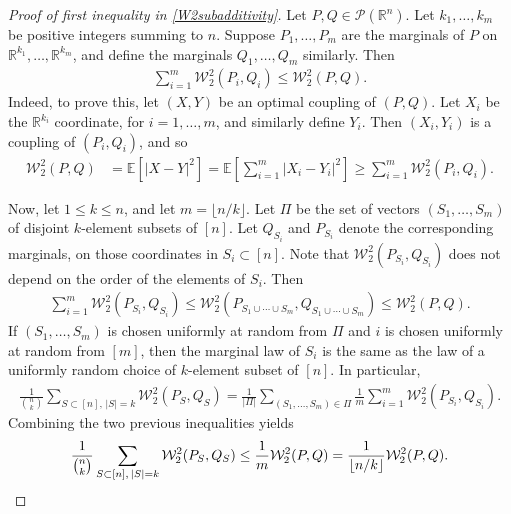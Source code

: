 \documentclass[11pt,reqno]{amsart}
\numberwithin{equation}{section}
\theoremstyle{definition}
\def\E{{\mathbb E}}
\def\R{{\mathbb R}}
\def\P{{\mathcal P}}
\begin{document}
\begin{proof}[Proof of first inequality in \eqref{W2subadditivity}]
	Let $P,Q \in \P(\R^n)$. Let $k_1,\ldots,k_m$ be positive integers summing to $n$. Suppose $P_1,\ldots,P_m$ are the marginals of $P$ on $\R^{k_1},\ldots,\R^{k_m}$, and define the marginals $Q_1,\ldots,Q_m$ similarly. Then
	\begin{align*}
		\sum_{i=1}^m \mathcal{W}_2^2(P_i,Q_i) \le \mathcal{W}_2^2(P,Q).
	\end{align*}
	Indeed, to prove this, let $(X,Y)$ be an optimal coupling of $(P,Q)$. Let $X_i$ be the $\R^{k_i}$ coordinate, for $i=1,\ldots,m$, and similarly define $Y_i$. Then $(X_i,Y_i)$ is a coupling of $(P_i,Q_i)$, and so
	\begin{align*}
		\mathcal{W}_2^2(P,Q) &= \E\left[|X-Y|^2\right] = \E\left[\sum_{i=1}^m  |X_i-Y_i|^2 \right]\ge \sum_{i=1}^m \mathcal{W}_2^2(P_i,Q_i).
	\end{align*}
	
	Now, let $1 \le k \le n$, and let $m=\lfloor n/k\rfloor$. Let $\Pi$ be the set of vectors $(S_1,\ldots,S_m)$ of disjoint $k$-element subsets of $[n]$. Let $Q_{S_i}$ and $P_{S_i}$ denote the corresponding marginals, on those coordinates in $S_i \subset [n]$. Note that $\mathcal{W}_2^2(P_{S_i},Q_{S_i})$ does not depend on the order of the elements of $S_i$. Then
	\begin{align*}
		\sum_{i=1}^m \mathcal{W}_2^2(P_{S_i},Q_{S_i}) \le \mathcal{W}_2^2(P_{S_1 \cup \cdots \cup S_m},Q_{S_1 \cup \cdots \cup S_m}) \le \mathcal{W}_2^2(P,Q).
	\end{align*}
	If $(S_1,\ldots,S_m)$ is chosen uniformly at random from $\Pi$ and $ i $ is chosen uniformly at random from $[m]$, then the marginal law of $S_i$ is the same as the law of a uniformly random choice of $k$-element subset of $[n]$.
	In particular,
	\begin{align*}
		\frac{1}{\binom{n}{k}}\sum_{S \subset [n], \, |S|=k} \mathcal{W}_2^2(P_{S},Q_{S}) = \frac{1}{|\Pi|}\sum_{(S_1,\ldots,S_m) \in \Pi}\frac{1}{m}\sum_{i=1}^m \mathcal{W}_2^2(P_{S_i},Q_{S_i}).
	\end{align*}
	Combining the two previous inequalities yields
	\begin{equation*}
		\frac{1}{\binom{n}{k}}\sum_{S \subset [n], \, |S|=k} \mathcal{W}_2^2(P_{S},Q_{S}) \le \frac{1}{m} \mathcal{W}_2^2(P,Q) = \frac{1}{\lfloor n/k\rfloor} \mathcal{W}_2^2(P,Q). \qedhere
	\end{equation*}
\end{proof}
\end{document}
